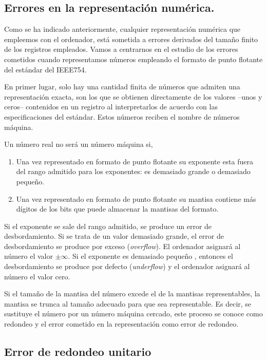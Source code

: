 \begin{paracol}{2}
\section{Errores en la representación numérica.}\label{errn}
Como se ha indicado anteriormente, cualquier representación numérica que empleemos con el ordenador, está sometida a errores derivados del tamaño finito de los registros empleados. Vamos a centrarnos en el estudio de los errores cometidos cuando representamos números empleando el formato de punto flotante del estándar del IEEE754.

En primer lugar, solo hay una cantidad finita de números que admiten una representación exacta, son los que se obtienen directamente de los valores --unos y ceros-- contenidos en un registro al interpretarlos de acuerdo con las especificaciones del estándar. Estos números reciben el nombre de números máquina. 

Un número real no será un número máquina si, 

\begin{enumerate}
\item Una vez representado en formato de punto flotante su exponente esta fuera del rango admitido para los exponentes: es demasiado grande o demasiado pequeño.

\item Una vez representado en formato de punto flotante su mantisa contiene más dígitos de los bits que puede almacenar la mantisas del formato. 
\end{enumerate}
 
Si el exponente se sale del rango admitido, se produce un error de desbordamiento. Si se trata de un valor demasiado grande, el error de desbordamiento se produce por exceso (\emph{overflow}). El ordenador asignará al número el valor $\pm \infty$. Si el exponente es demasiado pequeño , entonces el desbordamiento se produce por defecto (\emph{underflow}) y el ordenador asignará al número el valor cero.

Si el tamaño de la mantisa del número excede el de la mantisas representables, la mantisa se trunca al tamaño adecuado para que sea representable. Es decir, se sustituye el número por un número máquina cercado, este proceso se conoce como redondeo y el error cometido en la representación como error de redondeo.

\subsection{Error de redondeo unitario} 


\end{paracol}
